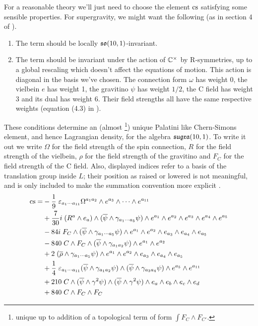 \documentclass[10pt, oneside]{article}
\begin{document}
For a reasonable theory we'll just need to choose the element $\mathrm{cs}$ satisfying some sensible properties.  For supergravity, we might want the following (as in section 4 of \cite{DF}).
\vspace{-12pt}
\begin{enumerate}
 \item The term should be locally $\mathfrak{so}(10,1)$-invariant.
 \item The term should be invariant under the action of $\mathbb{C}^\times$ by R-symmetries, up to a global rescaling which doesn't affect the equations of motion.  This action is diagonal in the basis we've chosen.  The connection form $\omega$ has weight 0, the vielbein $e$ has weight 1, the gravitino $\psi$ has weight $1/2$, the C field has weight $3$ and its dual has weight $6$.  Their field strengths all have the same respective weights (equation (4.3) in \cite{DF}).
\end{enumerate}
These conditions determine an (almost \footnote{unique up to addition of a topological term of form $\int F_C \wedge F_{C'}$.}) unique Palatini like Chern-Simons element, and hence Lagrangian density, for the algebra $\mathfrak{sugra}(10,1)$.  To write it out we write $\Omega$ for the field strength of the spin connection, $R$ for the field strength of the vielbein, $\rho$ for the field strength of the gravitino and $F_C$ for the field strength of the C field.  Also, displayed indices refer to a basis of the translation group inside $L$; their position as raised or lowered is not meaningful, and is only included to make the summation convention more explicit \cite{CDF}. 
\begin{align*}
\mathrm{cs} = &- \frac 19 \; \varepsilon_{a_1 \cdots a_{11}} \Omega^{a_1 a_2} \wedge e^{a_3} \wedge \cdots \wedge e^{a_{11}} \\
&+ \frac 7{30}i \; (R^a \wedge e_a) \wedge (\overline{\psi} \wedge \gamma_{a_1 \cdots a_5} \psi) \wedge e^{a_1} \wedge e^{a_2} \wedge e^{a_3} \wedge e^{a_4} \wedge e^{a_5} \\
&- 84 i \; F_C \wedge (\overline{\psi} \wedge \gamma_{a_1 \cdots a_5} \psi) \wedge e^{a_1} \wedge e^{a_2} \wedge e_{a_3} \wedge e_{a_4} \wedge e_{a_5}\\
&- 840 \;C \wedge F_C \wedge (\overline{\psi} \wedge \gamma_{a_1 a_2} \psi) \wedge e^{a_1} \wedge e^{a_2} \\
&+ 2 \;(\overline{\rho} \wedge \gamma_{a_1 \cdots a_5} \psi) \wedge e^{a_1} \wedge e^{a_2} \wedge e_{a_3} \wedge e_{a_4} \wedge e_{a_5}\\
&+ \frac 14 \; \varepsilon_{a_1 \cdots a_{11}} (\overline{\psi} \wedge \gamma_{a_1 a_2} \psi) \wedge (\overline{\psi} \wedge \gamma_{a_3 a_4} \psi) \wedge e^{a_5} \wedge e^{a_{11}} \\
&+ 210 \; C \wedge (\overline{\psi} \wedge \gamma^2 \psi) \wedge (\overline{\psi} \wedge \gamma^2 \psi) \wedge e_a \wedge e_b \wedge e_c \wedge e_d \\
&+ 840 \; C \wedge F_C \wedge F_C 
\end{align*}
\end{document}
